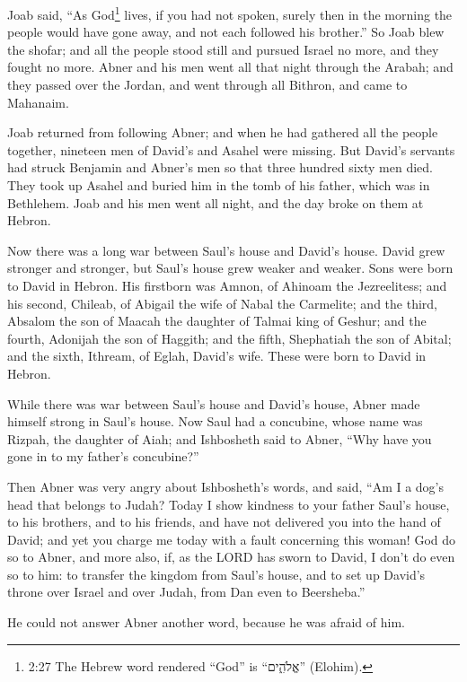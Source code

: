 \myverse{}Joab said, “As God\footnote{2:27 The Hebrew word rendered “God” is “אֱלֹהִ֑ים” (Elohim).} lives, if you had not
spoken, surely then in the morning the people would have gone away, and not each followed his brother.”
\myverse{}So Joab blew the shofar; and all the people stood still and pursued Israel
no more, and they fought no more.
\myverse{}Abner and his men went all that night through the Arabah; and they passed
over the Jordan, and went through all Bithron, and came to Mahanaim.

\myverse{}Joab returned from following Abner; and when he had gathered
all the people together, nineteen men of David’s and Asahel were missing.
\myverse{}But David’s servants had struck Benjamin and Abner’s men so that three hundred
sixty men died.
\myverse{}They took up Asahel and buried him in the tomb of his father, which was in
Bethlehem. Joab and his men went all night, and the day broke on them at Hebron.


\mychapter{} \myverse*{}Now there was a long war between Saul’s house and David’s house.
David grew stronger and stronger, but Saul’s house grew weaker and weaker.
\myverse{}Sons were born to David in Hebron. His firstborn was Amnon, of Ahinoam the Jezreelitess;
\myverse{}and his second, Chileab, of Abigail the wife of Nabal the Carmelite; and the
third, Absalom the son of Maacah the daughter of Talmai king of Geshur;
\myverse{}and the fourth, Adonijah the son of Haggith; and the fifth, Shephatiah the son
of Abital;
\myverse{}and the sixth, Ithream, of Eglah, David’s wife. These were born to David in
Hebron.

\myverse{}While there was war between Saul’s house and David’s house, Abner
made himself strong in Saul’s house.
\myverse{}Now Saul had a concubine, whose name was Rizpah, the daughter of Aiah; and Ishbosheth
said to Abner, “Why have you gone in to my father’s concubine?”

\myverse{}Then Abner was very angry about Ishbosheth’s words, and said, “Am
I a dog’s head that belongs to Judah? Today I show kindness to your father Saul’s house, to his brothers,
and to his friends, and have not delivered you into the hand of David; and yet you charge me today with
a fault concerning this woman!
\myverse{}God do so to Abner, and more also, if, as the LORD has sworn to David, I don’t
do even so to him:
\myverse{}to transfer the kingdom from Saul’s house, and to set up David’s throne over
Israel and over Judah, from Dan even to Beersheba.”

\myverse{}He could not answer Abner another word, because he was afraid
of him.

